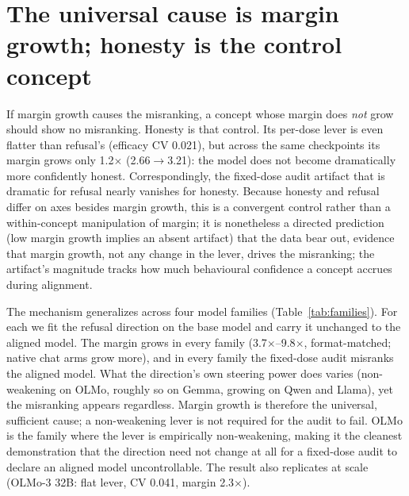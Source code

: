 \documentclass[11pt]{article}
\newcommand{\x}{$\times$}
\begin{document}
\section{The universal cause is margin growth; honesty is the control concept}\label{sec:universal}
If margin growth causes the misranking, a concept whose margin does \emph{not} grow should show no
misranking. Honesty is that control. Its per-dose lever is even flatter than refusal's (efficacy CV
\num{0.021}), but across the same checkpoints its margin grows only \num{1.2}\x{}
(\num{2.66}$\rightarrow$\num{3.21}): the model does not become dramatically more confidently honest.
Correspondingly, the fixed-dose audit artifact that is dramatic for refusal nearly vanishes for
honesty. Because honesty and refusal differ on axes besides margin growth, this is a convergent control rather than a within-concept manipulation of margin; it is nonetheless a directed prediction (low margin growth implies an absent artifact) that the data bear out, evidence that margin growth, not any change in
the lever, drives the misranking; the artifact's magnitude tracks how much behavioural confidence a
concept accrues during alignment.

The mechanism generalizes across four model families (Table~\ref{tab:families}). For each we fit the
refusal direction on the base model and carry it unchanged to the aligned model. The margin grows in
every family (\num{3.7}\x--\num{9.8}\x, format-matched; native chat arms grow more), and in every
family the fixed-dose audit misranks the aligned model. What the direction's own steering power does
varies (non-weakening on OLMo, roughly so on Gemma, growing on Qwen and Llama), yet the misranking
appears regardless. Margin growth is therefore the universal, sufficient cause; a non-weakening lever is
not required for the audit to fail. OLMo is the family where the lever is empirically non-weakening, making
it the cleanest demonstration that the direction need not change at all for a fixed-dose audit to
declare an aligned model uncontrollable. The result also replicates at scale (OLMo-3 32B: flat
lever, CV \num{0.041}, margin \num{2.3}\x).
\end{document}
